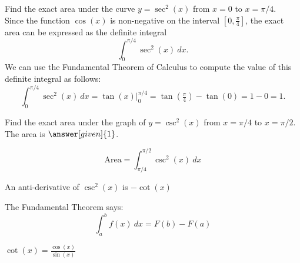 \documentclass{ximera}
\begin{document}
\begin{example} %
Find the exact area under the curve $y = \sec^2(x)$ from $x=0$ to $x= \pi/4$.\\
Since the function $\cos(x)$ is non-negative on the interval $[0, \frac{\pi}{4}]$, the exact area can be expressed as the definite integral
\[\int_0^{\pi/4} \sec^2(x) \ dx.\]
We can use the Fundamental Theorem of Calculus to compute the value of this definite integral as follows:
\[
\int_0^{\pi/4} \sec^2(x) \ dx = \tan(x) \Big|_0^{\pi/4} = \tan(\tfrac{\pi}{4}) - \tan(0) = 1-0 =1.
\] 


\begin{image}
\end{image}




\end{example}

\begin{problem} %
Find the exact area under the graph of $y = \csc^2(x)$ from $x = \pi/4$ to $x = \pi/2$.\\
The area is $\answer[given]{1}$.
 \begin{hint}
  \[
  \text{Area} = \int_{\pi/4}^{\pi/2} \csc^2(x) \ dx
  \]
\end{hint}  
    \begin{hint}
      An anti-derivative of $\csc^2(x)$ is $-\cot(x)$
    \end{hint}
    
    \begin{hint}
      The Fundamental Theorem says:
      \[
      \int_a^b f(x) \ dx = F(b) - F(a)
      \]
    \end{hint}    
		\begin{hint}
      $\cot(x) = \frac{\cos(x)}{\sin(x)}$
    \end{hint}
		
\end{problem}
\end{document}
